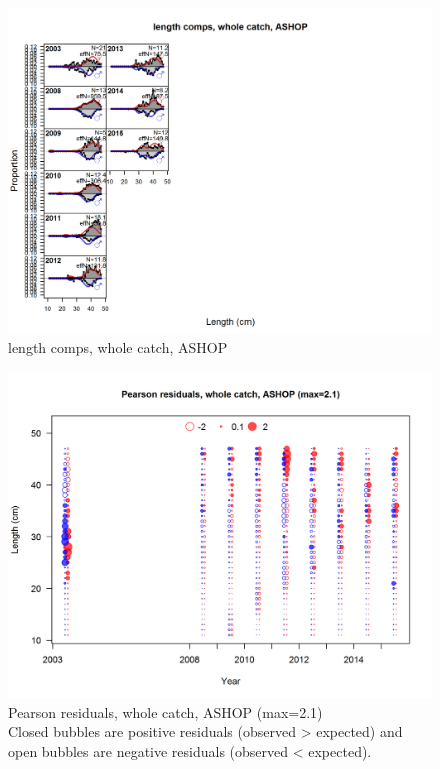 \documentclass[12pt,]{article}
\begin{document}
\begin{figure}
\centering
\includegraphics{./r4ss/plots_mod1/comp_lenfit_flt2mkt0.png}
\caption{length comps, whole catch, ASHOP
\label{fig:mod1_10_comp_lenfit_flt2mkt0}}
\end{figure}

\begin{figure}
\centering
\includegraphics{./r4ss/plots_mod1/comp_lenfit_residsflt2mkt0.png}
\caption{Pearson residuals, whole catch, ASHOP (max=2.1)\\
Closed bubbles are positive residuals (observed \textgreater{} expected)
and open bubbles are negative residuals (observed \textless{} expected).
\label{fig:mod1_11_comp_lenfit_residsflt2mkt0}}
\end{figure}
\end{document}
